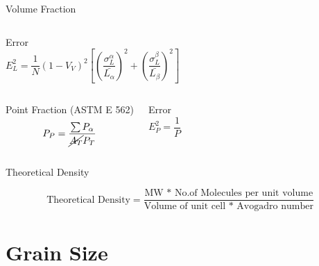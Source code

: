 \documentclass[10pt]{beamer}
\begin{document}
{\begin{frame}[fragile]{Volume Fraction}
\begin{columns}[T,onlytextwidth]

\begin{block}{Error}
\small
\begin{equation*}
E_{L}^{2} = \dfrac{1}{N}(1-V_{V})^{2}\left[ \left( \dfrac{\sigma^{\alpha}_{L}}{\bar{L_{\alpha}}} \right)^{2} + \left( \dfrac{\sigma^{\beta}_{L}}{\bar{L_{\beta}}} \right)^{2} \right]
\end{equation*}

\end{block}

\end{columns}

  \begin{columns}[T,onlytextwidth]
\begin{block}{Point Fraction (ASTM E 562)}
\begin{equation*}
P_{P} = \dfrac{\sum P_{\alpha}}{\cancel{A_{T}}P_{T}}
\end{equation*} 
\end{block}
 

\begin{block}{Error}
\begin{equation*}
E_{P}^{2} = \dfrac{1}{P}
\end{equation*} 
\end{block}

\end{columns}


 
    
\end{frame}
}
{%
\begin{frame}[fragile]{Theoretical Density}

\begin{equation*}
\text{Theoretical Density} = \dfrac{\text{MW * No.of Molecules per unit volume}}{\text{Volume of unit cell * Avogadro number}}
\end{equation*}   
    
\end{frame}
}
\section{Grain Size}
\end{document}
